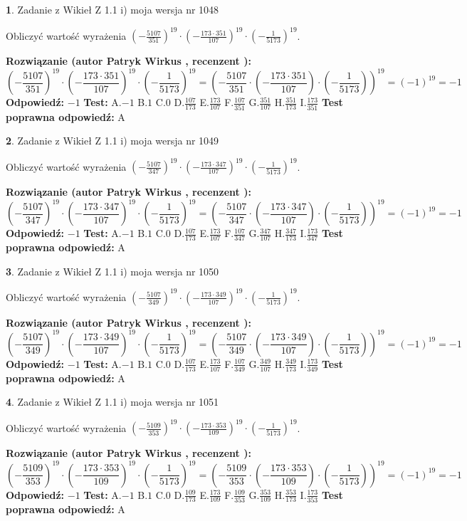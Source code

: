 \documentclass[12pt, a4paper]{article}
\theoremstyle{definition} %
\newtheorem{zad}{}
\newcommand{\zadStart}[1]{\begin{zad}#1\newline}
\newcommand{\zadStop}{\end{zad}}
\newcommand{\rozwStart}[2]{\noindent \textbf{Rozwiązanie (autor #1 , recenzent #2): }\newline}
\newcommand{\rozwStop}{\newline}
\newcommand{\odpStart}{\noindent \textbf{Odpowiedź:}\newline}
\newcommand{\odpStop}{\newline}
\newcommand{\testStart}{\noindent \textbf{Test:}\newline}
\newcommand{\testStop}{\newline}
\newcommand{\kluczStart}{\noindent \textbf{Test poprawna odpowiedź:}\newline}
\newcommand{\kluczStop}{\newline}
\begin{document}
\zadStart{Zadanie z Wikieł Z 1.1 i) moja wersja nr 1048}

Obliczyć wartość wyrażenia $(-\frac{5107}{351})^{19} \cdot (-\frac{173 \cdot 351}{107})^{19} \cdot (-\frac{1}{5173})^{19}$.
\zadStop
\rozwStart{Patryk Wirkus}{}
$$(-\frac{5107}{351})^{19} \cdot (-\frac{173 \cdot 351}{107})^{19} \cdot (-\frac{1}{5173})^{19} = (-\frac{5107}{351} \cdot (-\frac{173 \cdot 351}{107}) \cdot (-\frac{1}{5173}))^{19} = (-1)^{19} = -1$$
\rozwStop
\odpStart
$-1$
\odpStop
\testStart
A.$-1$ B.$1$ C.$0$ D.$\frac{107}{173}$ E.$\frac{173}{107}$
F.$\frac{107}{351}$ G.$\frac{351}{107}$
H.$\frac{351}{173}$
I.$\frac{173}{351}$
\testStop
\kluczStart
A
\kluczStop



\zadStart{Zadanie z Wikieł Z 1.1 i) moja wersja nr 1049}

Obliczyć wartość wyrażenia $(-\frac{5107}{347})^{19} \cdot (-\frac{173 \cdot 347}{107})^{19} \cdot (-\frac{1}{5173})^{19}$.
\zadStop
\rozwStart{Patryk Wirkus}{}
$$(-\frac{5107}{347})^{19} \cdot (-\frac{173 \cdot 347}{107})^{19} \cdot (-\frac{1}{5173})^{19} = (-\frac{5107}{347} \cdot (-\frac{173 \cdot 347}{107}) \cdot (-\frac{1}{5173}))^{19} = (-1)^{19} = -1$$
\rozwStop
\odpStart
$-1$
\odpStop
\testStart
A.$-1$ B.$1$ C.$0$ D.$\frac{107}{173}$ E.$\frac{173}{107}$
F.$\frac{107}{347}$ G.$\frac{347}{107}$
H.$\frac{347}{173}$
I.$\frac{173}{347}$
\testStop
\kluczStart
A
\kluczStop



\zadStart{Zadanie z Wikieł Z 1.1 i) moja wersja nr 1050}

Obliczyć wartość wyrażenia $(-\frac{5107}{349})^{19} \cdot (-\frac{173 \cdot 349}{107})^{19} \cdot (-\frac{1}{5173})^{19}$.
\zadStop
\rozwStart{Patryk Wirkus}{}
$$(-\frac{5107}{349})^{19} \cdot (-\frac{173 \cdot 349}{107})^{19} \cdot (-\frac{1}{5173})^{19} = (-\frac{5107}{349} \cdot (-\frac{173 \cdot 349}{107}) \cdot (-\frac{1}{5173}))^{19} = (-1)^{19} = -1$$
\rozwStop
\odpStart
$-1$
\odpStop
\testStart
A.$-1$ B.$1$ C.$0$ D.$\frac{107}{173}$ E.$\frac{173}{107}$
F.$\frac{107}{349}$ G.$\frac{349}{107}$
H.$\frac{349}{173}$
I.$\frac{173}{349}$
\testStop
\kluczStart
A
\kluczStop



\zadStart{Zadanie z Wikieł Z 1.1 i) moja wersja nr 1051}

Obliczyć wartość wyrażenia $(-\frac{5109}{353})^{19} \cdot (-\frac{173 \cdot 353}{109})^{19} \cdot (-\frac{1}{5173})^{19}$.
\zadStop
\rozwStart{Patryk Wirkus}{}
$$(-\frac{5109}{353})^{19} \cdot (-\frac{173 \cdot 353}{109})^{19} \cdot (-\frac{1}{5173})^{19} = (-\frac{5109}{353} \cdot (-\frac{173 \cdot 353}{109}) \cdot (-\frac{1}{5173}))^{19} = (-1)^{19} = -1$$
\rozwStop
\odpStart
$-1$
\odpStop
\testStart
A.$-1$ B.$1$ C.$0$ D.$\frac{109}{173}$ E.$\frac{173}{109}$
F.$\frac{109}{353}$ G.$\frac{353}{109}$
H.$\frac{353}{173}$
I.$\frac{173}{353}$
\testStop
\kluczStart
A
\kluczStop
\end{document}
